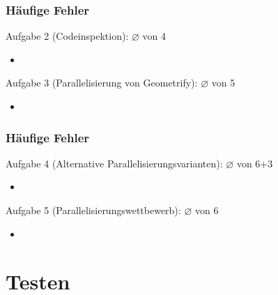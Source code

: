 \documentclass[18pt]{beamer}
\begin{document}
	\begin{frame}
		\frametitle{Häufige Fehler}
		\begin{block}{Aufgabe 2 (Codeinspektion): $\diameter$ von 4} %
			\begin{itemize}
				\pause 
				\item %
			\end{itemize}
		\end{block}
		\pause 
		\begin{block}{Aufgabe 3 (Parallelisierung von Geometrify): $\diameter$  von 5} %
			\begin{itemize}
				\pause
				\item %
			\end{itemize}
		\end{block}
	\end{frame}

	\begin{frame}
		\frametitle{Häufige Fehler}
		\begin{block}{Aufgabe 4 (Alternative Parallelisierungsvarianten): $\diameter$ von 6+3} %
			\begin{itemize}
				\pause
				\item %
			\end{itemize}
		\end{block}
		\pause
		\begin{block}{Aufgabe 5 (Parallelisierungswettbewerb): $\diameter$ von 6} %
			\begin{itemize}
				\pause
				\item %
			\end{itemize}
		\end{block}
	\end{frame}
		
\section{Testen}
\end{document}
